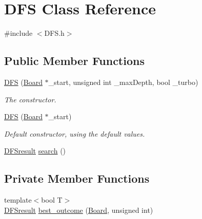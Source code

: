 \hypertarget{classDFS}{}\section{D\+FS Class Reference}
\label{classDFS}


{\ttfamily \#include $<$D\+F\+S.\+h$>$}

\subsection*{Public Member Functions}
\begin{DoxyCompactItemize}
\item 
\hyperlink{classDFS_a8db913929c53b5cba8f145c281ef99f8}{D\+FS} (\hyperlink{classBoard}{Board} $\ast$\+\_\+start, unsigned int \+\_\+max\+Depth, bool \+\_\+turbo)
\begin{DoxyCompactList}\small\item\em The constructor. \end{DoxyCompactList}\item 
\mbox{\label{classDFS_ac8748bddd420ae23a10620cb4b5714c5}} 
\hyperlink{classDFS_ac8748bddd420ae23a10620cb4b5714c5}{D\+FS} (\hyperlink{classBoard}{Board} $\ast$\+\_\+start)
\begin{DoxyCompactList}\small\item\em Default constructor, using the default values. \end{DoxyCompactList}\item 
\hyperlink{structDFSresult}{D\+F\+Sresult} \hyperlink{classDFS_a49982f77146f1839b15a36c6974e43d1}{search} ()
\end{DoxyCompactItemize}
\subsection*{Private Member Functions}
\begin{DoxyCompactItemize}
\item 
{\footnotesize template$<$bool T$>$ }\\\hyperlink{structDFSresult}{D\+F\+Sresult} \hyperlink{classDFS_a8b4c8f013eb056faee52530deb5a9971}{best\+\_\+outcome} (\hyperlink{classBoard}{Board}, unsigned int)
\end{DoxyCompactItemize}
